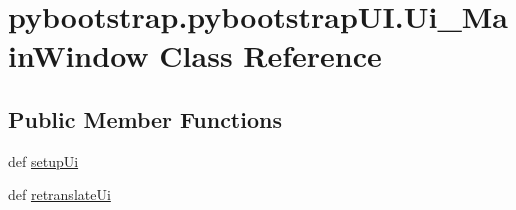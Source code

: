 \hypertarget{classpybootstrap_1_1pybootstrapUI_1_1Ui__MainWindow}{\section{pybootstrap.\-pybootstrap\-U\-I.\-Ui\-\_\-\-Main\-Window Class Reference}
\label{classpybootstrap_1_1pybootstrapUI_1_1Ui__MainWindow}
}
\subsection*{Public Member Functions}
\begin{DoxyCompactItemize}
\item 
def \hyperlink{classpybootstrap_1_1pybootstrapUI_1_1Ui__MainWindow_ab2a9d07236c4b1f4b2780edf664438ca}{setup\-Ui}
\item 
def \hyperlink{classpybootstrap_1_1pybootstrapUI_1_1Ui__MainWindow_a9b16a88aecfd3820228293b58d17b485}{retranslate\-Ui}
\end{DoxyCompactItemize}

